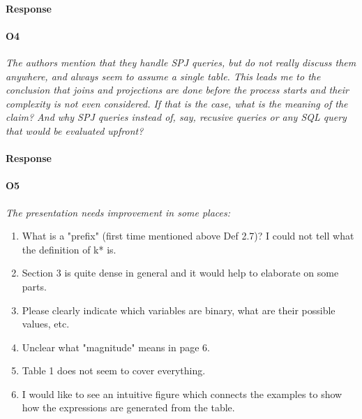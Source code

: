 \documentclass[main.tex]{subfile}
\begin{document}
\paragraph*{Response}


\paragraph*{{\bf O4}} 
{\it The authors mention that they handle SPJ queries, but do not really discuss them anywhere, and always seem to assume a single table. This leads me to the conclusion that joins and projections are done before the process starts and their complexity is not even considered. If that is the case, what is the meaning of the claim? And why SPJ queries instead of, say, recusive queries or any SQL query that would be evaluated upfront?}

\paragraph*{Response}


\paragraph*{{\bf O5}} 
{\it The presentation needs improvement in some places:
\begin{enumerate}
    \item What is a "prefix" (first time mentioned above Def 2.7)? I could not tell what the definition of k* is.
    \item Section 3 is quite dense in general and it would help to elaborate on some parts.
    \item Please clearly indicate which variables are binary, what are their possible values, etc.
    \item Unclear what "magnitude" means in page 6.
    \item Table 1 does not seem to cover everything.
    \item I would like to see an intuitive figure which connects the examples to show how the expressions are generated from the table.
\end{enumerate}
}
\end{document}
